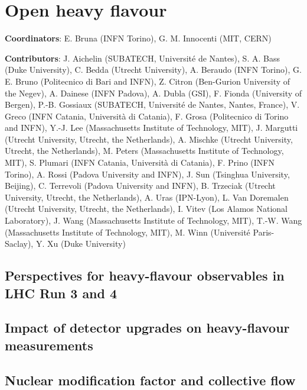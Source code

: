 \documentclass[../report.tex]{subfiles}
\providecommand{\main}{..}
\begin{document}
\clearpage
\section{Open heavy flavour}
\label{sec:HI_HF}

{ \small
\noindent 
\textbf{Coordinators}: E. Bruna (INFN Torino), G. M. Innocenti (MIT, CERN)

\noindent \textbf{Contributors}: 
J. Aichelin (SUBATECH, Universit\'e de Nantes),
S. A. Bass (Duke University),
C. Bedda (Utrecht University),
A. Beraudo (INFN Torino),
G. E. Bruno (Politecnico di Bari and INFN), 
Z. Citron (Ben-Gurion University of the Negev),
A. Dainese (INFN Padova),
A. Dubla (GSI),
F. Fionda (University of Bergen),
P.-B. Gossiaux (SUBATECH, Universit\'e de Nantes, Nantes, France),
V. Greco (INFN Catania, Universit\`a di Catania),
F. Grosa (Politecnico di Torino and INFN),
Y.-J. Lee (Massachusetts Institute of Technology, MIT),
J. Margutti (Utrecht University, Utrecht, the Netherlands),
A. Mischke (Utrecht University, Utrecht, the Netherlands),
M. Peters (Massachusetts Institute of Technology, MIT),
S. Plumari (INFN Catania, Universit\`a di Catania),
F. Prino (INFN Torino),
A. Rossi (Padova University and INFN),
J. Sun (Tsinghua University, Beijing),
C. Terrevoli (Padova University and INFN),
B. Trzeciak (Utrecht University, Utrecht, the Netherlands),
A. Uras (IPN-Lyon),
L. Van Doremalen (Utrecht University, Utrecht, the Netherlands),
I. Vitev (Los Alamos National Laboratory),
J. Wang (Massachusetts Institute of Technology, MIT),
T.-W. Wang (Massachusetts Institute of Technology, MIT),
M. Winn (Universit\'e Paris-Saclay),
Y. Xu (Duke University)
}



\subsection{Perspectives for heavy-flavour observables in LHC Run 3 and 4}


\subsection{Impact of detector upgrades on heavy-flavour measurements}


\subsection{Nuclear modification factor and collective flow}

\end{document}
